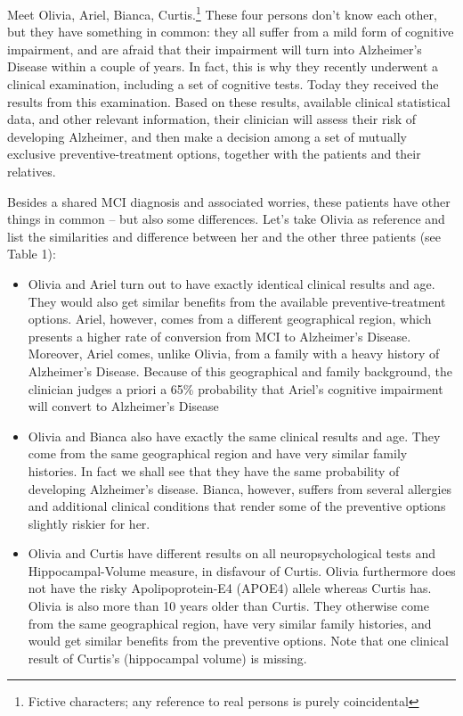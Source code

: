 \documentclass[utf8]{FrontiersinHarvard} %
\renewcommand*{\|}[1][]{\nonscript\:#1\vert\nonscript\:\mathopen{}}
\newcommand*{\ad}{Alzheimer's Disease}
\begin{document}
Meet Olivia, Ariel, Bianca, Curtis.\footnote{Fictive characters; any reference to real persons is purely coincidental}
These four persons don't know each other, but they have something in common: they all suffer from a mild form of cognitive impairment, and are afraid that their impairment will turn into Alzheimer's Disease within a couple of years. In fact, this is why they recently underwent a clinical examination, including a set of cognitive tests. Today they received the results from this examination. Based on these results, available clinical statistical data, and other relevant information, their clinician will
assess their risk of developing Alzheimer, and then make a decision among a set of mutually exclusive preventive-treatment options, together with the patients and their relatives.

Besides a shared MCI diagnosis and associated worries, these patients have other things in common -- but also some differences. Let's take Olivia as reference and list the similarities and difference between her and the other three patients (see Table 1):
\begin{itemize}
\item Olivia and Ariel turn out to have exactly identical clinical results and age. They would also get similar benefits from the available preventive-treatment options. Ariel, however, comes from a different geographical region, which presents a higher rate of conversion from MCI to \ad. Moreover, Ariel comes, unlike Olivia, from a family with a heavy history of Alzheimer's Disease. Because of this geographical and family background, the clinician judges a priori a 65\% probability that Ariel's cognitive impairment will convert to Alzheimer's Disease

\item Olivia and Bianca also have exactly the same clinical results and age. They come from the same geographical region and have very similar family histories. In fact we shall see that they have the same probability of developing Alzheimer's disease. Bianca, however, suffers from several allergies and additional clinical conditions that render some of the preventive options slightly riskier for her.

\item Olivia and Curtis have different results on all neuropsychological tests and Hippocampal-Volume measure, in disfavour of Curtis. Olivia furthermore does not have the risky Apolipoprotein-E4 (APOE4) allele \citep{liuetal2013} whereas Curtis has. Olivia is also more than 10 years older than Curtis. They otherwise come from the same geographical region, have very similar family histories, and would get similar benefits from the preventive options. Note that one clinical result of Curtis's (hippocampal volume) is missing.
\end{itemize}
\end{document}
